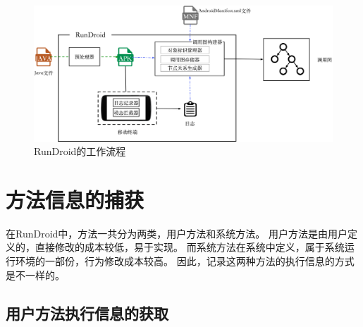 \begin{figure}[!ht]
	\centering
	\includegraphics[width=\textwidth]{./Figures/rundroid-overview.png}
	\caption{ RunDroid的工作流程}
	\label{fig:rundroid_overview}
\end{figure}





\section{方法信息的捕获}

在RunDroid中，方法一共分为两类，用户方法和系统方法。
用户方法是由用户定义的，直接修改的成本较低，易于实现。
而系统方法在系统中定义，属于系统运行环境的一部份，行为修改成本较高。
因此，记录这两种方法的执行信息的方式是不一样的。



\subsection{用户方法执行信息的获取}%


